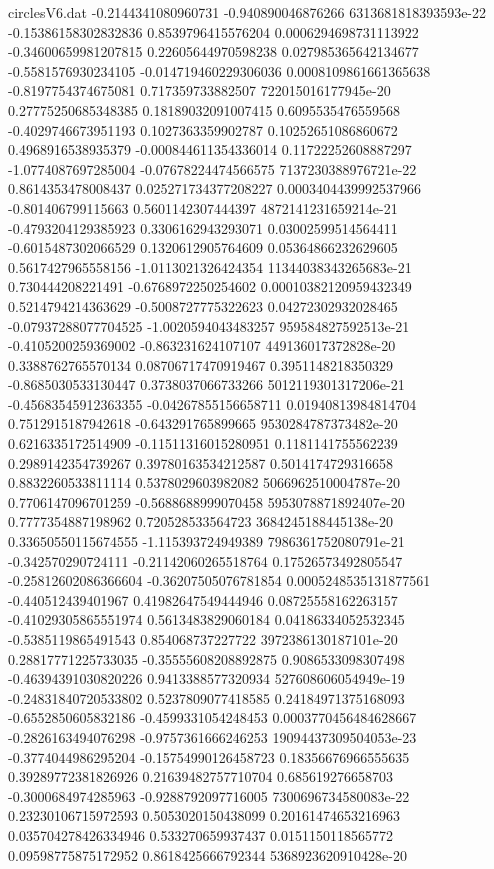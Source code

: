 \begin{filecontents}{circlesV6.dat}
-0.2144341080960731	-0.940890046876266	6313681818393593e-22
-0.15386158302832836	0.8539796415576204	0.0006294698731113922
-0.34600659981207815	0.22605644970598238	0.027985365642134677
-0.5581576930234105	-0.014719460229306036	0.0008109861661365638
-0.8197754374675081	0.717359733882507	722015016177945e-20
0.27775250685348385	0.18189032091007415	0.6095535476559568
-0.4029746673951193	0.1027363359902787	0.10252651086860672
0.4968916538935379	-0.000844611354336014	0.11722252608887297
-1.0774087697285004	-0.07678224474566575	7137230388976721e-22
0.8614353478008437	0.025271734377208227	0.0003404439992537966
-0.801406799115663	0.5601142307444397	4872141231659214e-21
-0.4793204129385923	0.3306162943293071	0.03002599514564411
-0.6015487302066529	0.1320612905764609	0.05364866232629605
0.5617427965558156	-1.0113021326424354	11344038343265683e-21
0.730444208221491	-0.6768972250254602	0.00010382120959432349
0.5214794214363629	-0.5008727775322623	0.04272302932028465
-0.07937288077704525	-1.0020594043483257	959584827592513e-21
-0.4105200259369002	-0.863231624107107	449136017372828e-20
0.3388762765570134	0.08706717470919467	0.3951148218350329
-0.8685030533130447	0.3738037066733266	5012119301317206e-21
-0.45683545912363355	-0.04267855156658711	0.01940813984814704
0.7512915187942618	-0.643291765899665	9530284787373482e-20
0.6216335172514909	-0.11511316015280951	0.1181141755562239
0.2989142354739267	0.39780163534212587	0.5014174729316658
0.8832260533811114	0.5378029603982082	5066962510004787e-20
0.7706147096701259	-0.5688688999070458	5953078871892407e-20
0.7777354887198962	0.720528533564723	3684245188445138e-20
0.33650550115674555	-1.115393724949389	7986361752080791e-21
-0.342570290724111	-0.21142060265518764	0.17526573492805547
-0.25812602086366604	-0.36207505076781854	0.0005248535131877561
-0.440512439401967	0.41982647549444946	0.08725558162263157
-0.41029305865551974	0.5613483829060184	0.04186334052532345
-0.5385119865491543	0.854068737227722	3972386130187101e-20
0.28817771225733035	-0.35555608208892875	0.9086533098307498
-0.46394391030820226	0.9413388577320934	527608606054949e-19
-0.24831840720533802	0.5237809077418585	0.24184971375168093
-0.6552850605832186	-0.4599331054248453	0.0003770456484628667
-0.2826163494076298	-0.9757361666246253	19094437309504053e-23
-0.3774044986295204	-0.15754990126458723	0.18356676966555635
0.39289772381826926	0.21639482757710704	0.685619276658703
-0.3000684974285963	-0.9288792097716005	7300696734580083e-22
0.23230106715972593	0.5053020150438099	0.20161474653216963
0.035704278426334946	0.533270659937437	0.0151150118565772
0.09598775875172952	0.8618425666792344	5368923620910428e-20

\end{filecontents}
